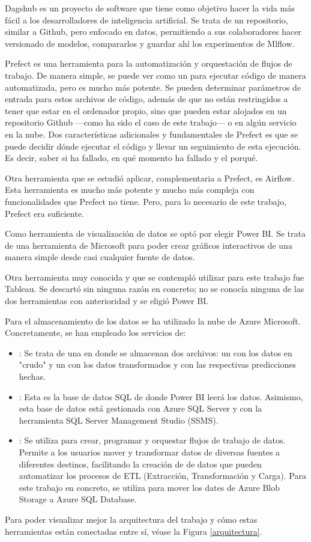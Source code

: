 Dagshub es un proyecto de software que tiene como objetivo hacer la vida más fácil a los desarrolladores de inteligencia artificial. Se trata de un repositorio, similar a Github, pero enfocado en datos, permitiendo a sus colaboradores hacer versionado de modelos, compararlos y guardar ahí los experimentos de Mlflow.

Prefect es una herramienta para la automatización y orquestación de flujos de trabajo. De manera simple, se puede ver como un  para ejecutar código de manera automatizada, pero es mucho más potente. Se pueden determinar parámetros de entrada para estos archivos de código, además de que no están restringidos a tener que estar en el ordenador propio, sino que pueden estar alojados en un repositorio Github ---como ha sido el caso de este trabajo--- o en algún servicio en la nube. Dos características adicionales y fundamentales de Prefect es que se puede decidir dónde ejecutar el código y llevar un seguimiento de esta ejecución. Es decir, saber si ha fallado, en qué momento ha fallado y el porqué. 

Otra herramienta que se estudió aplicar, complementaria a Prefect, es Airflow. Esta herramienta es mucho más potente y mucho más compleja con funcionalidades que Prefect no tiene. Pero, para lo necesario de este trabajo, Prefect era suficiente.

Como herramienta de visualización de datos se optó por elegir Power BI. Se trata de una herramienta de Microsoft para poder crear gráficos interactivos de una manera simple desde casi cualquier fuente de datos. 

Otra herramienta muy conocida y que se contempló utilizar para este trabajo fue Tableau. Se descartó sin ninguna razón en concreto; no se conocía ninguna de las dos herramientas con anterioridad y se eligió Power BI.

Para el almacenamiento de los datos se ha utilizado la nube de Azure Microsoft. Concretamente, se han empleado los servicios de:
\begin{itemize}
    \item {}: Se trata de una  en donde se almacenan dos archivos: un  con los datos en "crudo" y un  con los datos transformados y con las respectivas predicciones hechas.
    \item {}: Esta es la base de datos SQL de donde Power BI leerá los datos. Asimismo, esta base de datos está gestionada con Azure SQL Server y con la herramienta SQL Server Management Studio (SSMS).
    \item {}: Se utiliza para crear, programar y orquestar flujos de trabajo de datos. Permite a los usuarios mover y transformar datos de diversas fuentes a diferentes destinos, facilitando la creación de  de datos que pueden automatizar los procesos de ETL (Extracción, Transformación y Carga). Para este trabajo en concreto, se utiliza para mover los dates de Azure Blob Storage a Azure SQL Database.
\end{itemize}

Para poder visualizar mejor la arquitectura del trabajo y cómo estas herramientas están conectadas entre sí, véase la Figura \ref{arquitectura}.